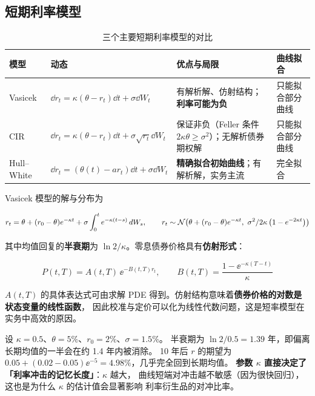 \subsection{短期利率模型}

\begin{table}[htbp]
\centering
\caption{三个主要短期利率模型的对比}\label{tab:06-shortrate}
\tablefont
\begin{tabularx}{\textwidth}{@{}L{2.3cm}L{3.5cm}Y L{2.6cm}@{}}
\toprule
\textbf{模型} & \textbf{动态} & \textbf{优点与局限} & \textbf{曲线拟合} \\
\midrule
Vasicek & $\dd r_t = \kappa(\theta-r_t)\dd t+\sigma\dd W_t$ & 有解析解、仿射结构；\textbf{利率可能为负} & 只能拟合部分曲线 \\
CIR & $\dd r_t = \kappa(\theta-r_t)\dd t+\sigma\sqrt{r_t}\dd W_t$ & 保证非负（Feller 条件 $2\kappa\theta\ge\sigma^2$）；无解析债券期权解 & 只能拟合部分曲线 \\
Hull--White & $\dd r_t = \left(\theta(t)-a r_t\right)\dd t+\sigma\dd W_t$ & \textbf{精确拟合初始曲线}；有解析解，实务主流 & 完全拟合 \\
\bottomrule
\end{tabularx}
\end{table}

Vasicek 模型的解与分布为

\begin{equation}
  r_t = \theta+(r_0-\theta)\ee^{-\kappa t}+\sigma\int_0^{t}\ee^{-\kappa(t-s)}\,\dd W_s,
  \qquad
  r_t\sim\N\!\left(\theta+(r_0-\theta)\ee^{-\kappa t},\ \frac{\sigma^2}{2\kappa}\left(1-\ee^{-2\kappa t}\right)\right)
  \label{eq:06-vasicek}
\end{equation}

其中均值回复的\textbf{半衰期}为 $\ln 2/\kappa$。零息债券价格具有\textbf{仿射形式}：

\begin{equation}
  P(t,T) = A(t,T)\,\ee^{-B(t,T)r_t},
  \qquad B(t,T) = \frac{1-\ee^{-\kappa(T-t)}}{\kappa}
  \label{eq:06-vasicek-bond}
\end{equation}

$A(t,T)$ 的具体表达式可由求解 PDE 得到。仿射结构意味着\textbf{债券价格的对数是状态变量的线性函数}，
因此校准与定价可以化为线性代数问题，这是短率模型在实务中高效的原因。

\begin{example}[均值回复速度的直观含义]\label{ex:06-vasicek}
设 $\kappa = 0.5$、$\theta = 5\%$、$r_0 = 2\%$、$\sigma = 1.5\%$。
半衰期为 $\ln2/0.5 = 1.39$ 年，即偏离长期均值的一半会在约 1.4 年内被消除。
10 年后 $r$ 的期望为 $0.05+(0.02-0.05)\ee^{-5} = 4.98\%$，几乎完全回到长期均值。
\textbf{参数 $\kappa$ 直接决定了「利率冲击的记忆长度」}：$\kappa$ 越大，
曲线短端对冲击越不敏感（因为很快回归），这也是为什么 $\kappa$ 的估计值会显著影响
利率衍生品的对冲比率。
\end{example}

